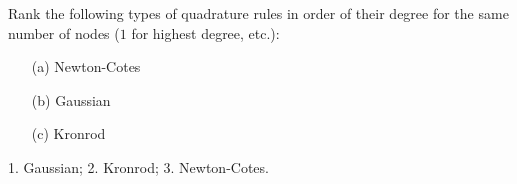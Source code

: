 \begin{pro}
  Rank the following types of quadrature rules
  in order of their degree for the same number of nodes
  ($1$ for highest degree, etc.):
  \begin{itemize}
  \item[(a)]
    Newton-Cotes

  \item[(b)]
    Gaussian

  \item[(c)]
    Kronrod
  \end{itemize}
\end{pro}

\begin{sol}
  1. Gaussian; 2. Kronrod; 3. Newton-Cotes.
\end{sol}
